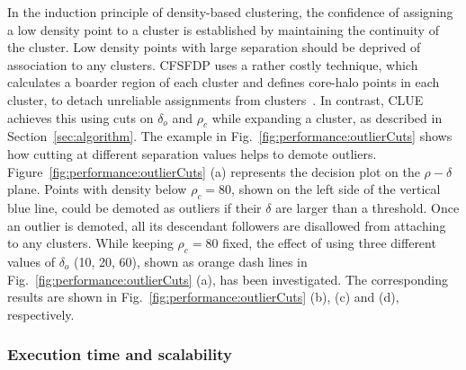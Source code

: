 In the induction principle of density-based clustering, the confidence of assigning a low density point to a cluster is established by maintaining the continuity of the cluster. Low density points with large separation should be deprived of association to any clusters. CFSFDP uses a rather costly technique, which calculates a boarder region of each cluster and defines core-halo points in each cluster, to detach unreliable assignments from clusters~\cite{rodriguez2014clustering}. In contrast, CLUE achieves this using cuts on $\delta_o$ and $\rho_c$ while expanding a cluster, as described in Section~\ref{sec:algorithm}. The example in Fig.~\ref{fig:performance:outlierCuts} shows how cutting at different separation values helps to demote outliers. Figure~\ref{fig:performance:outlierCuts} (a) represents the decision plot on the $\rho-\delta$ plane. Points with density below $\rho_c=80$, shown on the left side of the vertical blue line, could be demoted as outliers if their $\delta$ are larger than a threshold. Once an outlier is demoted, all its descendant followers are disallowed from attaching to any clusters. While keeping $\rho_c=80$ fixed, the effect of using three different values of $\delta_o$ (10, 20, 60), shown as orange dash lines in Fig.~\ref{fig:performance:outlierCuts} (a), has been investigated. The corresponding results are shown in Fig.~\ref{fig:performance:outlierCuts} (b),  (c) and (d), respectively.

\subsubsection{Execution time and scalability}
\label{sec:performance:executionTime}

